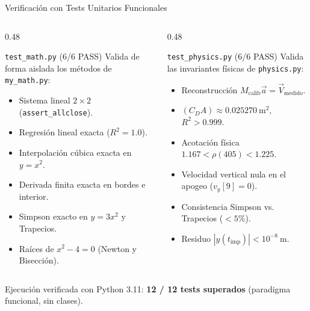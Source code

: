 \documentclass[aspectratio=169, 10pt]{beamer}
\begin{document}
\begin{frame}[fragile]{Verificación con Tests Unitarios Funcionales}
    \begin{columns}[T]
        \begin{column}{0.48\textwidth}
            \begin{block}{\texttt{test\_math.py} (6/6 PASS)}
                Valida de forma aislada los métodos de \texttt{my\_math.py}:
                \begin{itemize}
                    \item Sistema lineal $2\times 2$ (\texttt{assert\_allclose}).
                    \item Regresión lineal exacta ($R^2 = 1.0$).
                    \item Interpolación cúbica exacta en $y=x^2$.
                    \item Derivada finita exacta en bordes e interior.
                    \item Simpson exacto en $y=3x^2$ y Trapecios.
                    \item Raíces de $x^2-4=0$ (Newton y Bisección).
                \end{itemize}
            \end{block}
        \end{column}
        \begin{column}{0.48\textwidth}
            \begin{block}{\texttt{test\_physics.py} (6/6 PASS)}
                Valida las invariantes físicas de \texttt{physics.py}:
                \begin{itemize}
                    \item Reconstrucción $M_{\text{calib}}\vec{a} = \vec{V}_{\text{medido}}$.
                    \item $(C_D A) \approx 0.025270\ \mathrm{m^2}$, $R^2 > 0.999$.
                    \item Acotación física $1.167 < \rho(405) < 1.225$.
                    \item Velocidad vertical nula en el apogeo ($v_y[9]=0$).
                    \item Consistencia Simpson vs. Trapecios ($<5\%$).
                    \item Residuo $|y(t_{\text{imp}})| < 10^{-8}\ \mathrm{m}$.
                \end{itemize}
            \end{block}
        \end{column}
    \end{columns}
    \vspace{0.25cm}
    \centering
    \small Ejecución verificada con Python 3.11: \textbf{12 / 12 tests superados} (paradigma funcional, sin clases).
\end{frame}
\end{document}

